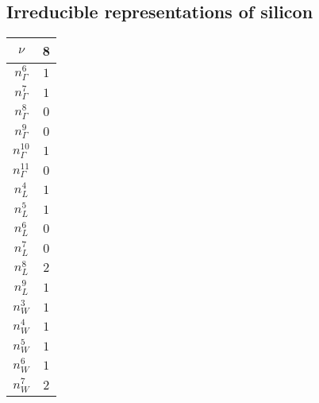 \documentclass[3p,preprint]{elsarticle}
\begin{document}

\subsection{Irreducible representations of silicon}\label{app:b-si}

\begin{table}[H]
	\begin{tabular}{|c|c|}\hline
		$\nu$ & 8 \\ \hline \hline
		$n_{\Gamma}^{6}$ & $1$\\ \hline
		$n_{\Gamma}^{7}$ & $1$\\ \hline
		$n_{\Gamma}^{8}$ & $0$\\ \hline
		$n_{\Gamma}^{9}$ & $0$\\ \hline
		$n_{\Gamma}^{{10}}$ & $1$\\ \hline
		$n_{\Gamma}^{{11}}$ & $0$\\ \hline \hline
		$n_{L}^{4}$ & $1$\\ \hline
		$n_{L}^{5}$ & $1$\\ \hline
		$n_{L}^{6}$ & $0$\\ \hline
		$n_{L}^{7}$ & $0$\\ \hline
		$n_{L}^{8}$ & $2$\\ \hline
		$n_{L}^{9}$ & $1$\\ \hline \hline
		$n_{W}^{3}$ & $1$\\ \hline
		$n_{W}^{4}$ & $1$\\ \hline
		$n_{W}^{5}$ & $1$\\ \hline
		$n_{W}^{6}$ & $1$\\ \hline
		$n_{W}^{7}$ & $2$\\ \hline 
	\end{tabular}
\end{table}
\end{document}
